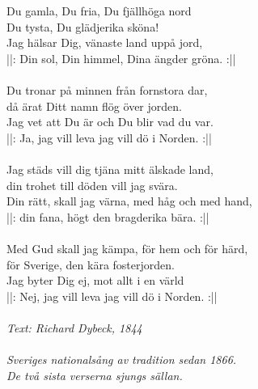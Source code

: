 Du gamla, Du fria, Du fjällhöga nord\\
Du tysta, Du glädjerika sköna!\\
Jag hälsar Dig, vänaste land uppå jord,\\
||: Din sol, Din himmel, Dina ängder gröna. :||\\
\\
Du tronar på minnen från fornstora dar,\\
då ärat Ditt namn flög över jorden.\\
Jag vet att Du är och Du blir vad du var.\\
||: Ja, jag vill leva jag vill dö i Norden. :||\\
\\
Jag städs vill dig tjäna mitt älskade land,\\
din trohet till döden vill jag svära.\\
Din rätt, skall jag värna, med håg och med hand,\\
||: din fana, högt den bragderika bära. :||\\
\\
Med Gud skall jag kämpa, för hem och för härd,\\
för Sverige, den kära fosterjorden.\\
Jag byter Dig ej, mot allt i en värld\\
||: Nej, jag vill leva jag vill dö i Norden. :||\\
\\
{\footnotesize\textit{Text: Richard Dybeck, 1844\\
\\
Sveriges nationalsång av tradition sedan 1866.\\
De två sista verserna sjungs sällan.}}
\clearpage
